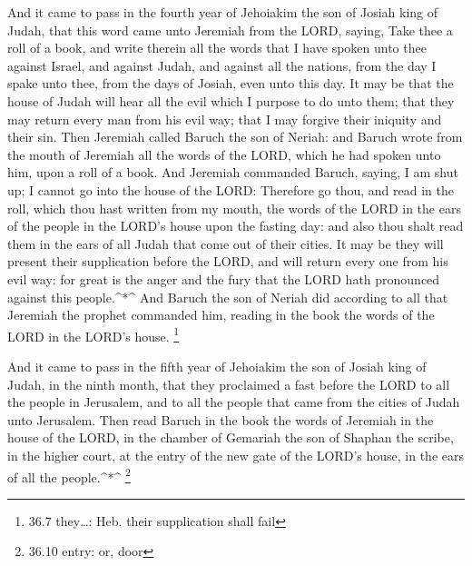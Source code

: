  And it came to pass in the fourth year of Jehoiakim the son
of Josiah king of Judah, that this word came unto Jeremiah from the
LORD, saying,  Take thee a roll of a book, and write therein
all the words that I have spoken unto thee against Israel, and against
Judah, and against all the nations, from the day I spake unto thee, from
the days of Josiah, even unto this day.  It may be that the
house of Judah will hear all the evil which I purpose to do unto them;
that they may return every man from his evil way; that I may forgive
their iniquity and their sin.  Then Jeremiah called Baruch
the son of Neriah: and Baruch wrote from the mouth of Jeremiah all the
words of the LORD, which he had spoken unto him, upon a roll of a book.
 And Jeremiah commanded Baruch, saying, I am shut up; I
cannot go into the house of the LORD:  Therefore go thou,
and read in the roll, which thou hast written from my mouth, the words
of the LORD in the ears of the people in the LORD's house upon the
fasting day: and also thou shalt read them in the ears of all Judah that
come out of their cities.  It may be they will present their
supplication before the LORD, and will return every one from his evil
way: for great is the anger and the fury that the LORD hath pronounced
against this people.\^{}*\^{}  And Baruch the son of Neriah
did according to all that Jeremiah the prophet commanded him, reading in
the book the words of the LORD in the LORD's house. \footnote{36.7
  they\ldots: Heb. their supplication shall fail}

 And it came to pass in the fifth year of Jehoiakim the son
of Josiah king of Judah, in the ninth month, that they proclaimed a fast
before the LORD to all the people in Jerusalem, and to all the people
that came from the cities of Judah unto Jerusalem.  Then
read Baruch in the book the words of Jeremiah in the house of the LORD,
in the chamber of Gemariah the son of Shaphan the scribe, in the higher
court, at the entry of the new gate of the LORD's house, in the ears of
all the people.\^{}*\^{} \footnote{36.10 entry: or, door}

